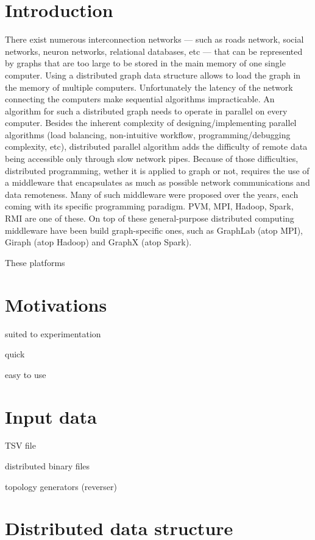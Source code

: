 \documentclass[11pt,a4paper]{article}
\author{Nicolas Chleq, Luc Hogie, Michel Syska}
\begin{document}
\section{Introduction}

There exist numerous interconnection networks --- such as roads network, social networks, neuron networks, relational databases, etc --- that can be represented by graphs  that are too large to be stored in the main memory of one single computer. Using a distributed graph data structure allows to load the graph in the memory of multiple computers. Unfortunately the latency of the network connecting the computers make sequential algorithms impracticable. An algorithm for such a distributed graph needs to operate in parallel on every computer. Besides the inherent complexity of designing/implementing parallel algorithms (load balancing, non-intuitive workflow, programming/debugging complexity, etc), distributed parallel algorithm adds the difficulty of remote data being accessible only through slow network pipes. 
Because of those difficulties, distributed programming, wether it is applied to graph or not,  requires the use of a middleware that encapsulates as much as possible network communications and data remoteness. 
Many of such middleware were proposed over the years, each coming with its specific programming paradigm. PVM, MPI, Hadoop, Spark, RMI are one of these.
On top of these general-purpose distributed computing middleware have been build graph-specific ones, such as GraphLab (atop MPI), Giraph (atop Hadoop) and GraphX (atop Spark). 

These platforms



\section{Motivations}

suited to experimentation

quick

easy to use


\section{Input data}

TSV file

distributed binary files

topology generators (reverser)

\section{Distributed data structure}
\end{document}
